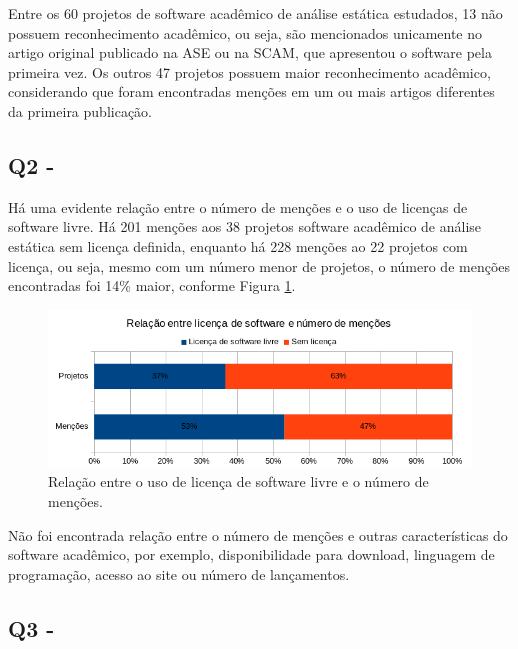 Entre os 60 projetos de software acadêmico de análise estática estudados, 
13 não possuem reconhecimento acadêmico, ou seja, são
mencionados unicamente no artigo original publicado na ASE ou na SCAM,
que apresentou o software pela primeira vez. 
Os outros 47 projetos possuem maior reconhecimento acadêmico, 
considerando que foram encontradas menções em um ou mais artigos
diferentes da primeira publicação.



\subsection{Q2 - \QuestaoDois} %

Há uma evidente relação entre o número de menções e o uso de licenças de
software livre. 
Há 201 menções aos 38 projetos software acadêmico de análise estática sem licença definida, 
enquanto há 228 menções ao 22 projetos com licença, ou seja, 
mesmo com um número menor de projetos, o número de menções encontradas foi 14\% maior, 
conforme Figura \ref{license-vs-mentions}.

\begin{figure}[h]
  \center
  \includegraphics[scale=0.6]{imagens/license-vs-mentions.png}
  \caption{Relação entre o uso de licença de software livre e o número de menções.}
  \label{license-vs-mentions}
\end{figure}

Não foi encontrada relação entre o número de menções e 
outras características do software acadêmico, por exemplo,
disponibilidade para download, linguagem de programação, acesso ao site ou número
de lançamentos.

\subsection{Q3 - \QuestaoTres} %

